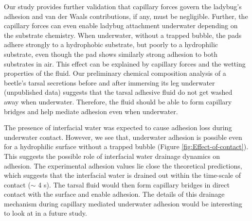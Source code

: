 \documentclass[vruler,JEB]{COB}%
\begin{document}
Our study provides further validation that capillary forces govern the ladybug's adhesion and van der Waals contributions,
if any, must be negligible. Further, the capillary forces can even
enable ladybug attachment underwater depending on the substrate chemistry.
When underwater, without a trapped bubble, the pads adhere strongly
to a hydrophobic substrate, but poorly to a hydrophilic substrate,
even though the pad shows similarly strong adhesion to both substrates
in air. This effect can be explained by capillary forces and the wetting properties of the fluid. Our
preliminary chemical composition analysis of a beetle's tarsal secretions before and after immersing its leg underwater (unpublished data) suggests that the tarsal adhesive fluid do not get washed away when underwater. Therefore, the fluid should be able to form capillary bridges and help mediate adhesion even when underwater.

The presence of interfacial water was expected to cause adhesion loss during underwater contact. However, we see that, underwater adhesion is possible even for a hydrophilic surface without a trapped bubble (Figure \ref{fig:Effect-of-contact}). This suggests the possible role of interfacial water drainage dynamics on adhesion. The experimental adhesion values lie close the theoretical predictions, which suggests that the interfacial water is drained out within the time-scale of contact ($\sim$ 4 s). The tarsal fluid would then form capillary bridges in direct contact with the surface and enable adhesion. The details of this drainage mechanism during capillary mediated underwater adhesion would be interesting to look at in a future study.
\end{document}
